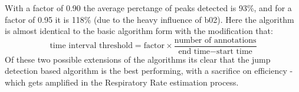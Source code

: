 With a factor of 0.90 the average perctange of peaks detected is 93\%, and for a factor of 0.95 
it is 118\% (due to the heavy influence of b02). Here the algorithm is almost 
identical to the basic algorithm form with the modification that:
\[
\text{time interval threshold}
= \text{factor} \times
\frac{\text{number of annotations}}
{\text{end time} - \text{start time}}
\] 
Of these two possible extensions of the algorithms its clear that the jump
detection based algorithm is the best performing, with a sacrifice on efficiency -
which gets amplified in the Respiratory Rate estimation process. 



